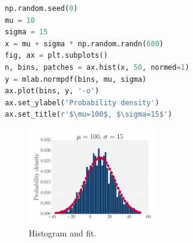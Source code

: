\documentclass[10pt,a4paper]{article}
\begin{document}
\newpage

\begin{lstlisting}[language=Python]
np.random.seed(0)
mu = 10
sigma = 15
x = mu + sigma * np.random.randn(600)
fig, ax = plt.subplots()
n, bins, patches = ax.hist(x, 50, normed=1)
y = mlab.normpdf(bins, mu, sigma)
ax.plot(bins, y, '-o')
ax.set_ylabel('Probability density')
ax.set_title(r'$\mu=100$, $\sigma=15$')
\end{lstlisting}
\begin{figure}[h]
  \centering
  \includegraphics[width=0.5\textwidth]{hist.pdf}
  \caption{Histogram and fit.}
\end{figure}
\end{document}
